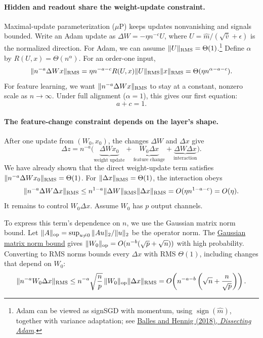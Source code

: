 \paragraph{Hidden and readout share the weight-update constraint.}
Maximal-update parameterization ($\mu$P) keeps updates nonvanishing and signals bounded.
Write an Adam update as $\Delta W=-\eta n^{-c}U$, where
$U=\widehat m/(\sqrt{\widehat v}+\epsilon)$ is the normalized direction.
For Adam, we can assume $\|U\|_{\rm RMS}=\Theta(1)$.\footnote{Adam can be viewed as signSGD with momentum, using $\operatorname{sign}(\widehat m)$, together with variance adaptation; see \href{https://arxiv.org/pdf/1705.07774}{Balles and Hennig (2018), \emph{Dissecting Adam}}.}
Define $\alpha$ by $R(U,x)=\Theta(n^\alpha)$. For an order-one input,
\[
 \|n^{-a}\Delta W x\|_{\rm RMS}
 =\eta n^{-a-c}R(U,x)\|U\|_{\rm RMS}\|x\|_{\rm RMS}
 =\Theta(\eta n^{\alpha-a-c}).
\]
For feature learning, we want $\|n^{-a}\Delta W x\|_{\rm RMS}$ to stay
at a constant, nonzero scale as $n\to\infty$. Under full alignment
($\alpha=1$), this gives our first equation:
\[
 a+c=1.
\]

\paragraph{The feature-change constraint depends on the layer's shape.}
After one update from $(W_0,x_0)$, the changes $\Delta W$ and $\Delta x$ give
\[
 \Delta z=n^{-a}\bigl(\underbrace{\Delta W x_0}_{\text{weight update}}
 +\underbrace{W_0\Delta x}_{\text{feature change}}
 +\underbrace{\Delta W\Delta x}_{\text{interaction}}\bigr).
\]
We have already shown that the direct weight-update term satisfies
$\|n^{-a}\Delta W x_0\|_{\rm RMS}=\Theta(1)$.
For $\|\Delta x\|_{\rm RMS}=\Theta(1)$, the interaction obeys
\[
 \|n^{-a}\Delta W\Delta x\|_{\rm RMS}
 \le n^{1-a}\|\Delta W\|_{\rm RMS}\|\Delta x\|_{\rm RMS}
 =O(\eta n^{1-a-c})=O(\eta).
\]
It remains to control $W_0\Delta x$. Assume $W_0$ has $p$ output channels.

To express this term's dependence on $n$, we use the Gaussian matrix norm bound.
Let $\|A\|_{\rm op}=\sup_{u\ne0}\|Au\|_2/\|u\|_2$ be the operator norm.
The
\href{https://www.math.uci.edu/~rvershyn/papers/HDP-book/HDP-1.pdf}{Gaussian matrix norm bound}
 gives $\|W_0\|_{\rm op}=O(n^{-b}(\sqrt p+\sqrt n))$ with high probability.
Converting to RMS norms bounds every $\Delta x$ with RMS $\Theta(1)$, including
changes that depend on $W_0$:
\[
 \|n^{-a}W_0\Delta x\|_{\rm RMS}
 \le n^{-a}\sqrt{\frac np}\,\|W_0\|_{\rm op}\|\Delta x\|_{\rm RMS}
 =O\!\left(n^{-a-b}\left(\sqrt n+\frac n{\sqrt p}\right)\right).
\]

